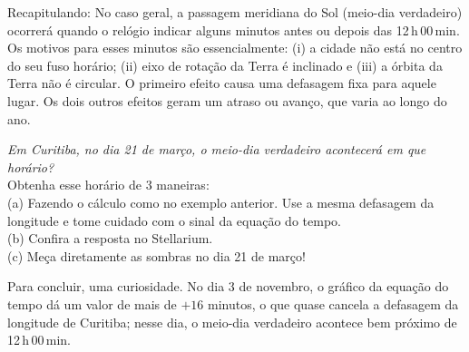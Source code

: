 Recapitulando: No caso geral, a passagem meridiana do Sol (meio-dia verdadeiro) ocorrerá quando o relógio indicar alguns minutos antes ou depois das 12\,h\,00\,min. Os motivos para esses minutos são essencialmente: (i) a cidade não está no centro do seu fuso horário; (ii) eixo de rotação da Terra é inclinado e (iii) a órbita da Terra não é circular. O primeiro efeito causa uma defasagem fixa para aquele lugar. Os dois outros efeitos geram um atraso ou avanço, que varia ao longo do ano. 

\begin{exemplo}{12}
\textit{Em Curitiba, no dia 21 de março, o meio-dia verdadeiro acontecerá em que horário?}\\

Obtenha esse horário de 3 maneiras:\\

(a) Fazendo o cálculo como no exemplo anterior. Use a mesma defasagem da longitude e tome cuidado com o sinal da equação do tempo.\\

(b) Confira a resposta no Stellarium.\\

(c) Meça diretamente as sombras no dia 21 de março! \\
 
\end{exemplo}


Para concluir, uma curiosidade. No dia 3 de novembro, o gráfico da equação do tempo dá um valor de mais de $+16$ minutos, o que quase cancela a defasagem da longitude de Curitiba; nesse dia, o meio-dia verdadeiro acontece bem próximo de 12\,h\,00\,min.



